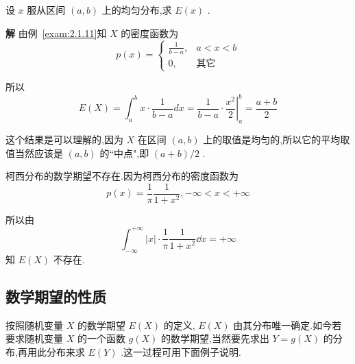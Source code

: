\begin{example}\label{exam:2.2.4}
	设 $ x $ 服从区间 $ (a,b) $ 上的均匀分布,求 $ E(x) $ .
	
	\textbf{解} 由例~\ref{exam:2.1.11}知 $ X $ 的密度函数为	
	\[ 
	p(x)=\left\{\begin{array}{ll}
	{\frac{1}{b-a}, }&{a<x<b} \\ {0,}&{\text{其它}}
	\end{array}\right.
	\]
	
	所以
	\[ 
	E(X)=\int_{a}^{b} x \cdot \frac{1}{b-a} d x=\frac{1}{b-a} \cdot\left.\frac{x^{2}}{2}\right|_{a} ^{b}=\frac{a+b}{2}
	\]
	
	这个结果是可以理解的,因为 $ X $ 在区间 $ (a,b) $ 上的取值是均匀的,所以它的平均取值当然应该是 $ (a,b) $ 的``中点",即 $ (a+b)/2 $ .
	
	
\end{example}

\begin{example}\label{exam:2.2.5}
	柯西分布的数学期望不存在.因为柯西分布的密度函数为
	\[ 
	p(x)=\frac{1}{\pi} \frac{1}{1+x^{2}},-\infty<x<+\infty
	\]
	
	所以由
	\[ 
	\int_{-\infty}^{+\infty}|x| \cdot \frac{1}{\pi} \frac{1}{1+x^{2}} \dd x=+\infty
	\]
	知 $ E(X) $ 不存在.
	
\end{example}

\subsection{数学期望的性质}\label{ssec:2.2.3}

按照随机变量 $ X $ 的数学期望 $ E(X) $ 的定义, $ E(X) $ 由其分布唯一确定.如今若要求随机变量 $ X $ 的一个函数 $ g(X) $ 的数学期望,当然要先求出 $ Y=g(X) $ 的分布,再用此分布来求 $ E(Y ) $ .这一过程可用下面例子说明.

